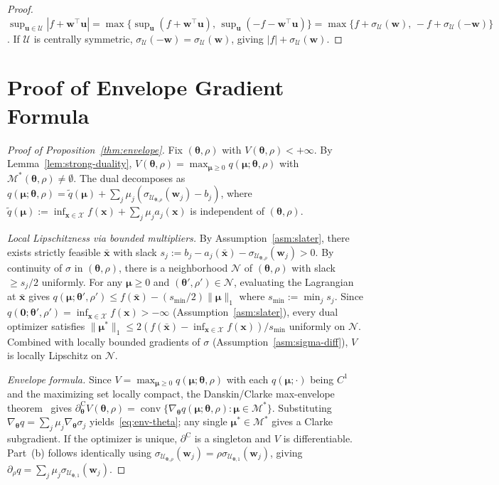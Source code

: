 \documentclass[11pt]{article}
\newcommand{\cU}{\mathcal{U}}
\newcommand{\cX}{\mathcal{X}}
\newcommand{\cM}{\mathcal{M}}
\newcommand{\btheta}{\bm{\theta}}
\newcommand{\bmu}{\bm{\mu}}
\newcommand{\bu}{\bm{u}}
\newcommand{\bw}{\bm{w}}
\newcommand{\bx}{\bm{x}}
\DeclareMathOperator{\conv}{conv}
\newcommand{\clsubd}{\partial^{\mathrm{C}}}
\theoremstyle{definition}
\begin{document}
\begin{proof}
$\sup_{\bu\in\cU}|f+\bw^\top\bu|=\max\{\sup_{\bu}(f+\bw^\top\bu),\,\sup_{\bu}(-f-\bw^\top\bu)\}=\max\{f+\sigma_\cU(\bw),\,-f+\sigma_\cU(-\bw)\}$. If $\cU$ is centrally symmetric, $\sigma_\cU(-\bw)=\sigma_\cU(\bw)$, giving $|f|+\sigma_\cU(\bw)$.
\end{proof}

\section{Proof of Envelope Gradient Formula}
\label{app:envelope-proof}

\begin{proof}[Proof of Proposition~\ref{thm:envelope}]
Fix $(\btheta,\rho)$ with $V(\btheta,\rho)<+\infty$. By Lemma~\ref{lem:strong-duality}, $V(\btheta,\rho)=\max_{\bmu\ge 0}q(\bmu;\btheta,\rho)$ with $\cM^*(\btheta,\rho)\neq\emptyset$. The dual decomposes as $q(\bmu;\btheta,\rho)=\tilde q(\bmu)+\sum_j\mu_j(\sigma_{\cU_{\btheta,\rho}}(\bw_j)-b_j)$, where $\tilde q(\bmu):=\inf_{\bx\in\cX}f(\bx)+\sum_j\mu_ja_j(\bx)$ is independent of $(\btheta,\rho)$.

\emph{Local Lipschitzness via bounded multipliers.}
By Assumption~\ref{asm:slater}, there exists strictly feasible $\bar{\bx}$ with slack $s_j:=b_j-a_j(\bar{\bx})-\sigma_{\cU_{\btheta,\rho}}(\bw_j)>0$. By continuity of $\sigma$ in $(\btheta,\rho)$, there is a neighborhood $\mathcal{N}$ of $(\btheta,\rho)$ with slack $\ge s_j/2$ uniformly. For any $\bmu\ge 0$ and $(\btheta',\rho')\in\mathcal{N}$, evaluating the Lagrangian at $\bar{\bx}$ gives $q(\bmu;\btheta',\rho')\le f(\bar{\bx})-(s_{\min}/2)\|\bmu\|_1$ where $s_{\min}:=\min_j s_j$. Since $q(\bm{0};\btheta',\rho')=\inf_{\bx\in\cX}f(\bx)>-\infty$ (Assumption~\ref{asm:slater}), every dual optimizer satisfies $\|\bmu^*\|_1\le 2(f(\bar{\bx})-\inf_{\bx\in\cX}f(\bx))/s_{\min}$ uniformly on $\mathcal{N}$. Combined with locally bounded gradients of $\sigma$ (Assumption~\ref{asm:sigma-diff}), $V$ is locally Lipschitz on $\mathcal{N}$.

\emph{Envelope formula.}
Since $V=\max_{\bmu\ge 0}q(\bmu;\btheta,\rho)$ with each $q(\bmu;\cdot)$ being $C^1$ and the maximizing set locally compact, the Danskin/Clarke max-envelope theorem~\citep{bonnans2000perturbation,clarke1990optimization} gives $\clsubd_{\btheta}V(\btheta,\rho)=\conv\{\nabla_{\btheta}q(\bmu;\btheta,\rho):\bmu\in\cM^*\}$. Substituting $\nabla_{\btheta}q=\sum_j\mu_j\nabla_{\btheta}\sigma_j$ yields~\eqref{eq:env-theta}; any single $\bmu^*\in\cM^*$ gives a Clarke subgradient. If the optimizer is unique, $\clsubd$ is a singleton and $V$ is differentiable. Part~(b) follows identically using $\sigma_{\cU_{\btheta,\rho}}(\bw_j)=\rho\sigma_{\cU_{\btheta,1}}(\bw_j)$, giving $\partial_\rho q=\sum_j\mu_j\sigma_{\cU_{\btheta,1}}(\bw_j)$.
\end{proof}
\end{document}
